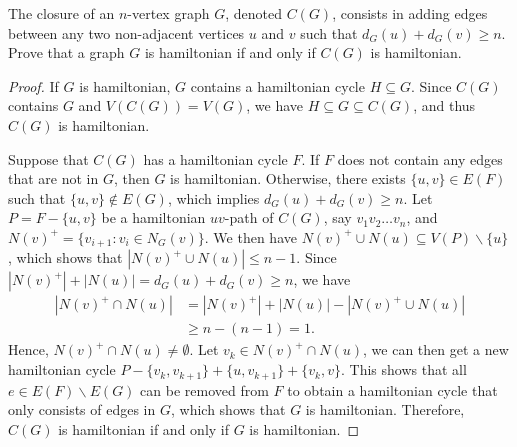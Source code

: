 \documentclass{article}
\newenvironment{problem}[2][Question]{\begin{trivlist}
\item[\hskip \labelsep {\bfseries #1}\hskip \labelsep {\bfseries #2.}]}{\end{trivlist}}
\begin{document}
\begin{problem}{2.5.9}
    The closure of an $n$-vertex graph $G$, denoted $C(G)$, consists in adding edges between any two non-adjacent vertices $u$ and $v$ such that $d_G(u)+d_G(v) \geq n$. Prove that a graph $G$ is hamiltonian if and only if $C(G)$ is hamiltonian.
\end{problem}
\begin{proof}
    If $G$ is hamiltonian, $G$ contains a hamiltonian cycle $H \subseteq G$. Since $C(G)$ contains $G$ and $V(C(G)) = V(G)$, we have $H \subseteq G \subseteq C(G)$, and thus $C(G)$ is hamiltonian. 
    
    Suppose that $C(G)$ has a hamiltonian cycle $F$. If $F$ does not contain any edges that are not in $G$, then $G$ is hamiltonian. Otherwise, there exists $\{u, v\} \in E(F)$ such that $\{u, v\} \notin E(G)$, which implies $d_G(u)+d_G(v) \geq n$. Let $P = F - \{u, v\}$ be a hamiltonian $uv$-path of $C(G)$, say $v_1v_2\dots v_n$, and $N(v)^+ = \{v_{i+1} : v_i \in N_G(v)\}$. We then have $N(v)^+ \cup N(u) \subseteq V(P)\backslash \{u\}$, which shows that $|N(v)^+ \cup N(u)| \leq n - 1$. Since $|N(v)^+| + |N(u)| = d_G(u)+d_G(v) \geq n$, we have
    \begin{align}
        |N(v)^+ \cap N(u)|
        &= |N(v)^+| + |N(u)| - |N(v)^+ \cup N(u)| \\
        &\geq n - (n - 1) = 1.
    \end{align}
    Hence, $N(v)^+ \cap N(u) \neq \emptyset$. Let $v_k \in N(v)^+ \cap N(u)$, we can then get a new hamiltonian cycle $P - \{v_k, v_{k+1}\} + \{u, v_{k+1}\} + \{v_k, v\}$. This shows that all $e \in E(F)\backslash E(G)$ can be removed from $F$ to obtain a hamiltonian cycle that only consists of edges in $G$, which shows that $G$ is hamiltonian. Therefore, $C(G)$ is hamiltonian if and only if $G$ is hamiltonian.
\end{proof}

\newpage
\end{document}
